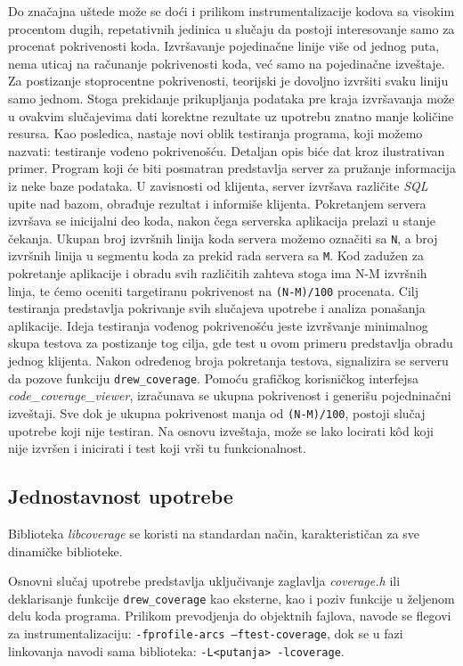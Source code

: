 \documentclass[12pt,oneside]{memoir}
\newcommand{\kod}[1]{\texttt{#1}}
\newcommand{\strano}[1]{\textit{#1}}
\begin{document}
Do značajna uštede može se doći i prilikom instrumentalizacije kodova sa visokim procentom dugih, repetativnih jedinica u slučaju da postoji interesovanje samo za procenat pokrivenosti koda. Izvršavanje pojedinačne linije više od jednog puta, nema uticaj na računanje pokrivenosti koda, već samo na pojedinačne izveštaje. Za postizanje stoprocentne pokrivenosti, teorijski je dovoljno izvršiti svaku liniju samo jednom. Stoga prekidanje prikupljanja podataka pre kraja izvršavanja može u ovakvim slučajevima dati korektne rezultate uz upotrebu znatno manje količine resursa. Kao posledica, nastaje novi oblik testiranja programa, koji možemo nazvati: testiranje vođeno pokrivenošću. Detaljan opis biće dat kroz ilustrativan primer. Program koji će biti posmatran predstavlja server za pružanje informacija iz neke baze podataka. U zavisnosti od klijenta, server izvršava različite \strano{SQL} upite nad bazom, obrađuje rezultat i informiše klijenta. Pokretanjem servera izvršava se inicijalni deo koda, nakon čega serverska aplikacija prelazi u stanje čekanja. Ukupan broj izvršnih linija koda servera možemo označiti sa \kod{N}, a broj izvršnih linija u segmentu koda za prekid rada servera sa \kod{M}. Kod zadužen za pokretanje aplikacije i obradu svih različitih zahteva stoga ima N-M izvršnih linja, te ćemo oceniti targetiranu pokrivenost na \kod{(N-M)/100} procenata. Cilj testiranja predstavlja pokrivanje svih slučajeva upotrebe i analiza ponašanja aplikacije. Ideja testiranja vođenog pokrivenošću jeste izvršvanje minimalnog skupa testova za postizanje tog cilja, gde test u ovom primeru predstavlja obradu jednog klijenta. Nakon određenog broja pokretanja testova, signalizira se serveru da pozove funkciju \kod{drew\_coverage}. Pomoću grafičkog korisničkog interfejsa \strano{code\_coverage\_viewer}, izračunava se ukupna pokrivenost i generišu pojedninačni izveštaji. Sve dok je ukupna pokrivenost manja od \kod{(N-M)/100}, postoji slučaj upotrebe koji nije testiran. Na osnovu izveštaja, može se lako locirati k\^{o}d koji nije izvršen i inicirati i test koji vrši tu funkcionalnost.

\subsection{Jednostavnost upotrebe}

Biblioteka \strano{libcoverage} se koristi na standardan način, karakterističan za sve dinamičke biblioteke. 

Osnovni slučaj upotrebe predstavlja uključivanje zaglavlja \strano{coverage.h} ili deklarisanje funkcije \kod{drew\_coverage} kao eksterne, kao i poziv funkcije u željenom delu koda programa. Prilikom prevodjenja do objektnih fajlova, navode se flegovi za instrumentalizaciju: \kod{-fprofile-arcs –ftest-coverage}, dok se u fazi linkovanja navodi sama biblioteka: \kod{-L<putanja> -lcoverage}.
\end{document}
